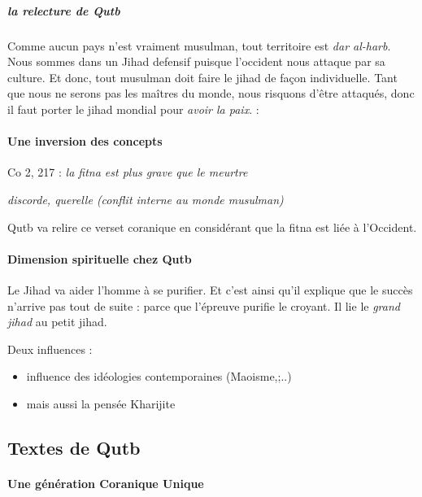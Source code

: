 \subparagraph{la relecture de Qutb}
Comme aucun pays n'est vraiment musulman, tout territoire est \textit{dar al-harb}. Nous sommes dans un Jihad defensif puisque l'occident nous attaque par sa culture. Et donc, tout musulman doit faire le jihad de façon individuelle. 
Tant que nous ne serons pas les maîtres du monde, nous risquons d'être attaqués, donc il faut porter le jihad mondial pour \textit{avoir la paix}. 
: 
\paragraph{Une inversion des concepts} Co 2, 217 : \textit{la fitna est plus grave que le meurtre}

\begin{Def}[fitna]

\emph{discorde, querelle (conflit interne au monde musulman)}

\end{Def}

Qutb va relire ce verset coranique en considérant que la fitna est liée à l'Occident.


\paragraph{Dimension spirituelle chez Qutb} Le Jihad va aider l'homme à se purifier. Et c'est ainsi qu'il explique que le succès n'arrive pas tout de suite : parce que l'épreuve purifie le croyant. Il lie le \textit{grand jihad} au petit jihad.

\begin{Synthesis}
Deux influences : 
\begin{itemize}
    \item influence des idéologies contemporaines (Maoisme,;..)
    \item mais aussi la pensée Kharijite 
\end{itemize}
\end{Synthesis}
 \subsection{Textes de Qutb}
\paragraph{Une génération Coranique Unique}

